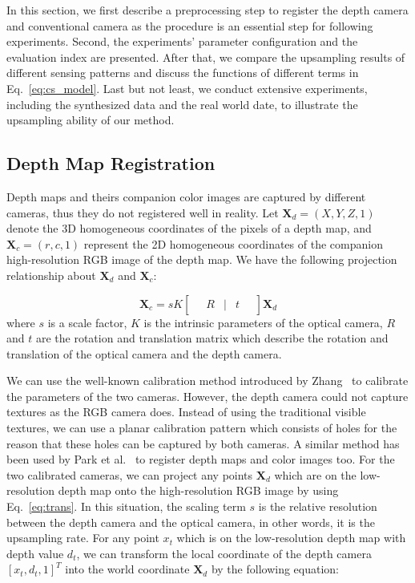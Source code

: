 \documentclass[preprint,10pt,5p,times,twocolumn]{elsarticle}
\begin{document}
In this section, we first describe a preprocessing step to register the depth camera and conventional camera as the procedure is an essential step for following experiments. Second, the experiments' parameter configuration and the evaluation index are presented. After that, we compare the upsampling results of different sensing patterns and discuss the functions of different terms in Eq.~\eqref{eq:cs_model}. Last but not least, we conduct extensive experiments, including the synthesized data and the real world date, to illustrate the upsampling ability of our method.

\subsection{Depth Map Registration}
\label{chap:registration}
Depth maps and theirs companion color images are captured by different cameras, thus they do not registered well in reality. Let $\mathbf{X}_d = (X,Y,Z,1)$ denote the 3D homogeneous coordinates of the pixels of a depth map, and $\mathbf{X}_c = (r,c,1)$ represent the 2D homogeneous coordinates of the companion high-resolution RGB image of the depth map. We have the following projection relationship about $\mathbf{X}_d$ and $\mathbf{X}_c$:

\begin{equation}
\mathbf{X}_c = sK \begin{bmatrix} \quad R &| & t \quad \end{bmatrix} \mathbf{X}_d
\label{eq:trans}
\end{equation}
where $s$ is a scale factor, $K$ is the intrinsic parameters of the
optical camera, $R$ and $t$ are the rotation and translation matrix which describe the rotation and translation of the optical camera and the depth camera.

We can use the well-known calibration method introduced by Zhang~\cite{Zhang2000} to calibrate the parameters of the two cameras. However, the depth camera could not capture textures as the RGB camera does. Instead of using the traditional visible textures, we can use a planar calibration pattern which consists of holes for the reason that these holes can be captured by both cameras. A similar method has been used by Park et al.~\cite{PKTBK11} to register depth maps and color images too. For the two calibrated cameras, we can project any points $\mathbf{X}_d$ which are on the low-resolution depth map onto the high-resolution RGB image by using Eq.~\eqref{eq:trans}. In this situation, the scaling term $s$ is the relative resolution between the depth camera and the optical camera, in other words, it is the upsampling rate. For any point $x_t$ which is on the low-resolution depth map with depth value $d_t$, we can transform the local coordinate of the depth camera $[x_t, d_t, 1]^T$ into the world coordinate $\mathbf{X}_d$ by the following equation:
\end{document}
